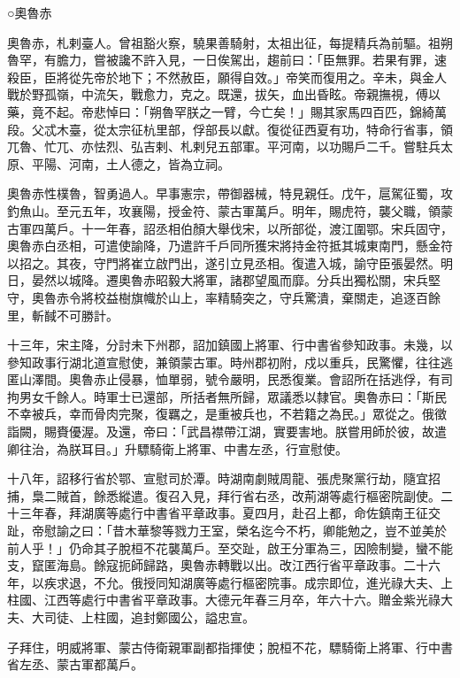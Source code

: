 \begin{pinyinscope}
 ○奧魯赤



 奧魯赤，札剌臺人。曾祖豁火察，驍果善騎射，太祖出征，每提精兵為前驅。祖朔魯罕，有膽力，嘗被讒不許入見，一日俟駕出，趨前曰：「臣無罪。若果有罪，速殺臣，臣將從先帝於地下；不然赦臣，願得自效。」帝笑而復用之。辛未，與金人戰於野孤嶺，中流矢，戰愈力，克之。既還，拔矢，血出昏眩。帝親撫視，傅以藥，竟不起。帝悲悼曰：「朔魯罕朕之一臂，今亡矣！」賜其家馬四百匹，錦綺萬段。父忒木臺，從太宗征杭里部，俘部長以獻。復從征西夏有功，特命行省事，領兀魯、忙兀、亦怯烈、弘吉剌、札剌兒五部軍。平河南，以功賜戶二千。嘗駐兵太原、平陽、河南，土人德之，皆為立祠。



 奧魯赤性樸魯，智勇過人。早事憲宗，帶御器械，特見親任。戊午，扈駕征蜀，攻釣魚山。至元五年，攻襄陽，授金符、蒙古軍萬戶。明年，賜虎符，襲父職，領蒙古軍四萬戶。十一年春，詔丞相伯顏大舉伐宋，以所部從，渡江圍鄂。宋兵固守，奧魯赤白丞相，可遣使諭降，乃遣許千戶同所獲宋將持金符抵其城東南門，懸金符以招之。其夜，守門將崔立啟門出，遂引立見丞相。復遣入城，諭守臣張晏然。明日，晏然以城降。遷奧魯赤昭毅大將軍，諸郡望風而靡。分兵出獨松關，宋兵堅守，奧魯赤令將校益樹旗幟於山上，率精騎突之，守兵驚潰，棄關走，追逐百餘里，斬馘不可勝計。



 十三年，宋主降，分討未下州郡，詔加鎮國上將軍、行中書省參知政事。未幾，以參知政事行湖北道宣慰使，兼領蒙古軍。時州郡初附，戍以重兵，民驚懼，往往逃匿山澤間。奧魯赤止侵暴，恤單弱，號令嚴明，民悉復業。會詔所在括逃俘，有司拘男女千餘人。時軍士已還部，所括者無所歸，眾議悉以隸官。奧魯赤曰：「斯民不幸被兵，幸而骨肉完聚，復羈之，是重被兵也，不若籍之為民。」眾從之。俄徵詣闕，賜賚優渥。及還，帝曰：「武昌襟帶江湖，實要害地。朕嘗用師於彼，故遣卿往治，為朕耳目。」升驃騎衛上將軍、中書左丞，行宣慰使。



 十八年，詔移行省於鄂、宣慰司於潭。時湖南劇賊周龍、張虎聚黨行劫，隨宜招捕，梟二賊首，餘悉縱遣。復召入見，拜行省右丞，改荊湖等處行樞密院副使。二十三年春，拜湖廣等處行中書省平章政事。夏四月，赴召上都，命佐鎮南王征交趾，帝慰諭之曰：「昔木華黎等戮力王室，榮名迄今不朽，卿能勉之，豈不並美於前人乎！」仍命其子脫桓不花襲萬戶。至交趾，啟王分軍為三，因險制變，蠻不能支，竄匿海島。餘寇扼師歸路，奧魯赤轉戰以出。改江西行省平章政事。二十六年，以疾求退，不允。俄授同知湖廣等處行樞密院事。成宗即位，進光祿大夫、上柱國、江西等處行中書省平章政事。大德元年春三月卒，年六十六。贈金紫光祿大夫、大司徒、上柱國，追封鄭國公，謚忠宣。



 子拜住，明威將軍、蒙古侍衛親軍副都指揮使；脫桓不花，驃騎衛上將軍、行中書省左丞、蒙古軍都萬戶。




\end{pinyinscope}
